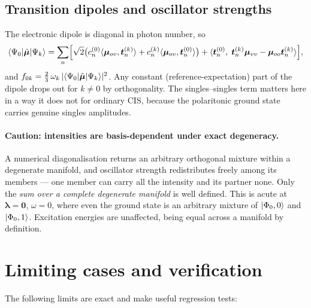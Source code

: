 \documentclass[11pt]{article}
\newcommand{\lam}{\bm{\lambda}}
\begin{document}
\subsection{Transition dipoles and oscillator strengths}

The electronic dipole is diagonal in photon number, so
\begin{equation}
\braket{\Psi_0 | \hat{\bm{\mu}} | \Psi_k}
= \sum_n \Bigl[
   \sqrt{2}\bigl( c_n^{(0)} \langle \bm{\mu}_{ov}, \bm{t}_n^{(k)}\rangle
                + c_n^{(k)} \langle \bm{\mu}_{ov}, \bm{t}_n^{(0)}\rangle \bigr)
 + \langle \bm{t}_n^{(0)},\; \bm{t}_n^{(k)}\bm{\mu}_{vv} - \bm{\mu}_{oo}\bm{t}_n^{(k)} \rangle
 \Bigr],
\label{eq:tdm}
\end{equation}
and $f_{0k} = \tfrac{2}{3}\,\omega_k\,\lvert \braket{\Psi_0|\hat{\bm{\mu}}|\Psi_k}\rvert^2$.
Any constant (reference-expectation) part of the dipole drops out for $k \ne 0$
by orthogonality. The singles--singles term matters here in a way it does not
for ordinary CIS, because the polaritonic ground state carries genuine singles
amplitudes.

\paragraph{Caution: intensities are basis-dependent under exact degeneracy.}
A numerical diagonalisation returns an arbitrary orthogonal mixture within a
degenerate manifold, and oscillator strength redistributes freely among its
members --- one member can carry all the intensity and its partner none. Only
the \emph{sum over a complete degenerate manifold} is well defined. This is
acute at $\lam = \bm{0}$, $\omega = 0$, where even the ground state is an
arbitrary mixture of $\ket{\Phi_0,0}$ and $\ket{\Phi_0,1}$. Excitation energies
are unaffected, being equal across a manifold by definition.

\section{Limiting cases and verification}
\label{sec:verification}

The following limits are exact and make useful regression tests:
\end{document}
